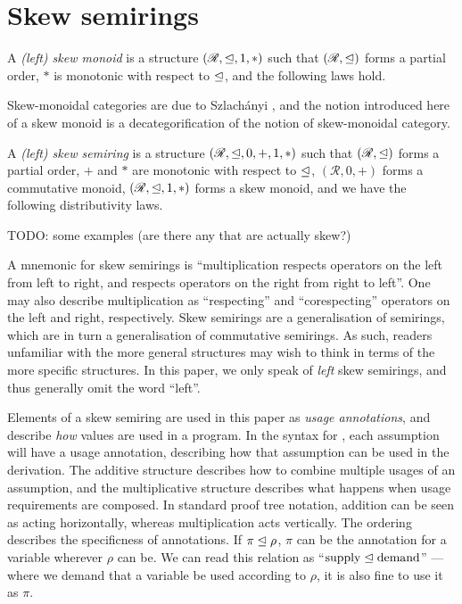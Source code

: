 \documentclass[submission,copyright,creativecommons]{eptcs}
\begin{document}
\section{Skew semirings}

A \emph{(left) skew monoid} is a structure $(\mathscr R, \trianglelefteq, 1, *)$ such
that $(\mathscr R, \trianglelefteq)$ forms a partial order, $*$ is monotonic with
respect to $\trianglelefteq$, and the following laws hold.

Skew-monoidal categories are due to Szlach\'anyi \cite{skew}, and the notion
introduced here of a skew monoid is a decategorification of the notion of
skew-monoidal category.

A \emph{(left) skew semiring} is a structure $(\mathscr R, \trianglelefteq, 0, +, 1, *)$
such that $(\mathscr R, \trianglelefteq)$ forms a partial order, $+$ and $*$ are
monotonic with respect to $\trianglelefteq$, $(\mathscr R, 0, +)$ forms a commutative
monoid, $(\mathscr R, \trianglelefteq, 1, *)$ forms a skew monoid, and we have the
following distributivity laws.

\begin{example}
  TODO: some examples (are there any that are actually skew?)
\end{example}

A mnemonic for skew semirings is ``multiplication respects operators on the left
from left to right, and respects operators on the right from right to left''.
One may also describe multiplication as ``respecting'' and ``corespecting''
operators on the left and right, respectively.
Skew semirings are a generalisation of semirings, which are in turn a
generalisation of commutative semirings.
As such, readers unfamiliar with the more general structures may wish to think
in terms of the more specific structures.
In this paper, we only speak of \emph{left} skew semirings, and thus generally
omit the word ``left''.

Elements of a skew semiring are used in this paper as \emph{usage annotations},
and describe \emph{how} values are used in a program.
In the syntax for \name, each assumption will have a usage annotation,
describing how that assumption can be used in the derivation.
The additive structure describes how to combine multiple usages of an
assumption, and the multiplicative structure describes what happens when usage
requirements are composed.
In standard proof tree notation, addition can be seen as acting horizontally,
whereas multiplication acts vertically.
The ordering describes the specificness of annotations.
If $\pi \trianglelefteq \rho$, $\pi$ can be the annotation for a variable wherever
$\rho$ can be.
We can read this relation as ``$\textrm{supply} \trianglelefteq \textrm{demand}$'' ---
where we demand that a variable be used according to $\rho$, it is also fine to
use it as $\pi$.
\end{document}
